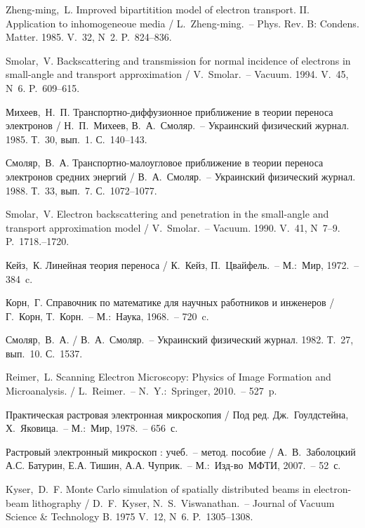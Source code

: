 \def\bibname{Список использованной литературы}
\begin{thebibliography}{99}  

 Zheng-ming,~L. Improved bipartitition model of electron
transport. II. Application to inhomogeneoue media / L.~Zheng-ming.~-- Phys. Rev. B:
Condens. Matter. 1985. V.~32, N~2. P.~824--836.

 Smolar,~V. Backscattering and transmission for normal
incidence of electrons in small-angle and transport approximation /
V.~Smolar.~-- Vacuum. 1994. V.~45, N~6. P.~609--615.

 Михеев,~Н.~П. Транспортно-диффузионное приближение в теории
переноса электронов / Н.~П.~Михеев, В.~А.~Смоляр.~-- Украинский физический
журнал. 1985. Т.~30, вып.~1. С.~140--143.

 Смоляр,~В.~А. Транспортно-малоугловое приближение в теории
переноса электронов средних энергий / В.~А.~Смоляр.~-- Украинский физический
журнал. 1988. Т.~33, вып.~7. С.~1072--1077.

 Smolar,~V. Electron backscattering and penetration in the
small-angle and transport approximation model / V.~Smolar.~-- Vacuum. 1990.
V.~41, N~7--9. P.~1718.--1720.

 Кейз,~К. Линейная теория переноса / К.~Кейз, П.~Цвайфель.~--
М.:~Мир, 1972.~-- 384~c.

 Корн,~Г. Справочник по математике для научных работников и
инженеров /  Г.~Корн, Т.~Корн.~-- М.:~Наука, 1968.~-- 720~c.

 Смоляр,~В.~А. / В.~А.~Смоляр.~-- Украинский физический журнал.
1982. Т.~27, вып.~10. С.~1537. %


 Reimer,~L. Scanning Electron Microscopy: Physics of Image Formation
and Microanalysis. / L.~Reimer.~-- N.~Y.:~Springer, 2010.~-- 527~p.

 Практическая растровая электронная микроскопия / Под ред.
Дж.~Гоулдстейна, Х.~Яковица.~-- М.:~Мир, 1978.~-- 656~с.

 Растровый электронный микроскоп : учеб.~-- метод. пособие /
А.~В.~Заболоцкий А.С. Батурин, Е.А. Тишин, А.А. Чуприк.~-- М.:~Изд-во~МФТИ, 2007.~--
52~с.

 Kyser,~D.~F. Monte Carlo simulation of spatially
distributed beams in electron-beam lithography / D.~F.~Kyser,
N.~S.~Viswanathan.~-- Journal of Vacuum Science \& Technology B. 1975 V.~12,
N~6. P.~1305--1308.


\end{thebibliography}
